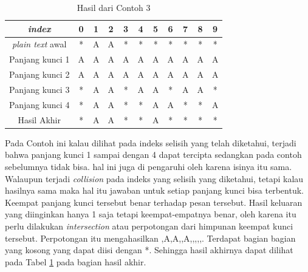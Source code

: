 	\begin{table}[H]
		\centering
		\caption{Hasil dari Contoh 3}
		\begin{tabular}{|c|c|c|c|c|c|c|c|c|c|c|}\hline
		\textit{index}&0&1&2&3&4&5&6&7&8&9\\ \hline	
		\textit{plain text} awal&*&A&A&*&*&*&*&*&*&*\\ \hline
		Panjang kunci 1 &A&A&A&A&A&A&A&A&A&A\\ \hline
		Panjang kunci 2 &A&A&A&A&A&A&A&A&A&A\\ \hline
		Panjang kunci 3 &*&A&A&*&A&A&*&A&A&*\\ \hline
		Panjang kunci 4 &*&A&A&*&*&A&A&*&*&A\\ \hline
		Hasil Akhir     &*&A&A&*&*&A&*&*&*&*\\ \hline
		\end{tabular}
		\label{tab:res_contoh_3}
	\end{table}
	Pada Contoh ini kalau dilihat pada indeks selisih yang telah diketahui, terjadi bahwa panjang kunci 1 sampai dengan 4 dapat tercipta sedangkan pada contoh sebelumnya tidak bisa. hal ini juga di pengaruhi oleh karena isinya itu sama. Walaupun terjadi \textit{collision} pada indeks yang selisih yang diketahui, tetapi kalau hasilnya sama maka hal itu jawaban untuk setiap panjang kunci bisa terbentuk. Keempat panjang kunci tersebut benar terhadap pesan tersebut. Hasil keluaran yang diinginkan hanya 1 saja tetapi keempat-empatnya benar, oleh karena itu perlu dilakukan \textit{intersection} atau perpotongan dari himpunan keempat kunci tersebut. Perpotongan itu mengahasilkan {,A,A,,A,,,,,}. Terdapat bagian bagian yang kosong yang dapat  diisi dengan *. Sehingga hasil akhirnya dapat dilihat pada Tabel \ref{tab:res_contoh_3} pada bagian hasil akhir.
	
